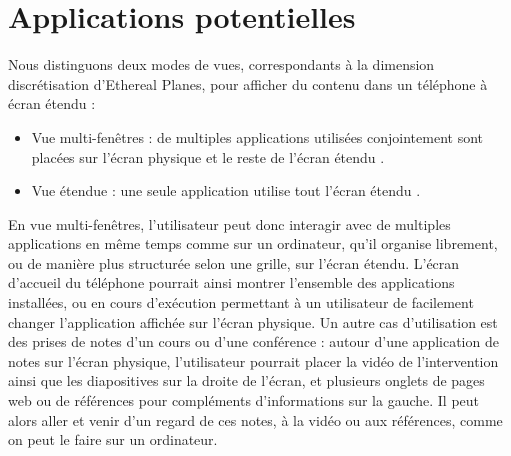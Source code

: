 \section{Applications potentielles}
\label{sec:concept_applications}

Nous distinguons deux modes de vues, correspondants à la dimension discrétisation d'Ethereal Planes, pour afficher du contenu dans un téléphone à écran étendu :
\begin{itemize}
  \item Vue multi-fenêtres : de multiples applications utilisées conjointement sont placées sur l'écran physique et le reste de l'écran étendu .
  \item Vue étendue : une seule application utilise tout l'écran étendu .
\end{itemize}
\bigskip


En vue multi-fenêtres, l'utilisateur peut donc interagir avec de multiples applications en même temps comme sur un ordinateur, qu'il organise librement, ou de manière plus structurée selon une grille, sur l'écran étendu. L'écran d'accueil du téléphone pourrait ainsi montrer l'ensemble des applications installées, ou en cours d'exécution  permettant à un utilisateur de facilement changer l'application affichée sur l'écran physique. Un autre cas d'utilisation est des prises de notes d'un cours ou d'une conférence : autour d'une application de notes sur l'écran physique, l'utilisateur pourrait placer la vidéo de l'intervention ainsi que les diapositives sur la droite de l'écran, et plusieurs onglets de pages web ou de références pour compléments d'informations sur la gauche. Il peut alors aller et venir d'un regard de ces notes, à la vidéo ou aux références, comme on peut le faire sur un ordinateur.

